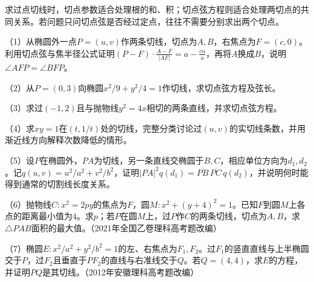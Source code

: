 求过点切线时，切点参数适合处理根的和、积；切点弦方程则适合处理两切点的共同关系。若问题只问切点弦是否经过定点，往往不需要分别求出两个切点。

\begin{exercise}
\mbox{}\par\nobreak
\begin{samepage}
（1）从椭圆外一点\(P=(u,v)\)作两条切线，切点为\(A,B\)，右焦点为\(F=(c,0)\)。利用切点弦与焦半径公式证明\(\displaystyle (P-F)\cdot\frac{A-F}{|AF|}=a-\frac{cu}{a}\)，再将\(A\)换成\(B\)，说明\(\angle AFP=\angle BFP\)。
\par
\end{samepage}

\begin{samepage}
（2）从\(P=(0,3)\)向椭圆\(x^2/9+y^2/4=1\)作切线，求切点弦方程及弦长。
\par
\end{samepage}

\begin{samepage}
（3）求过\((-1,2)\)且与抛物线\(y^2=4x\)相切的两条直线，并求切点弦方程。
\par
\end{samepage}

\begin{samepage}
（4）求\(xy=1\)在\((t,1/t)\)处的切线，完整分类讨论过\((u,v)\)的实切线条数，并用渐近线方向解释次数降低的情形。
\par
\end{samepage}

\begin{samepage}
（5）设\(P\)在椭圆外，\(PA\)为切线，另一条直线交椭圆于\(B,C\)，相应单位方向为\(d_1,d_2\)。记\(q(u,v)=u^2/a^2+v^2/b^2\)，证明\(|PA|^2q(d_1)=\overline{PB}\,\overline{PC}\,q(d_2)\)，并说明何时能得到通常的切割线长度关系。
\par
\end{samepage}

\begin{samepage}
（6）抛物线\(C:x^2=2py\)的焦点为\(F\)，圆\(M:x^2+(y+4)^2=1\)。已知\(F\)到圆\(M\)上各点的距离最小值为\(4\)。求\(p\)；若\(P\)在圆\(M\)上，过\(P\)作\(C\)的两条切线，切点为\(A,B\)，求\(\triangle PAB\)面积的最大值。（2021年全国乙卷理科高考题改编）
\par
\end{samepage}

\begin{samepage}
（7）椭圆\(E:x^2/a^2+y^2/b^2=1\)的左、右焦点为\(F_1,F_2\)。过\(F_1\)的竖直直线与上半椭圆交于\(P\)，过\(F_2\)且垂直于\(PF_2\)的直线与右准线交于\(Q\)。若\(Q=(4,4)\)，求\(E\)的方程，并证明\(PQ\)是其切线。（2012年安徽理科高考题改编）
\par
\end{samepage}
\end{exercise}

